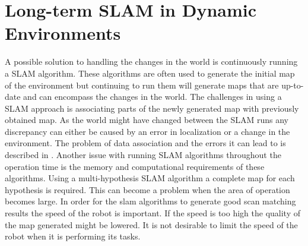 \section{Long-term SLAM in Dynamic Environments}
A possible solution to handling the changes in the world is continuously running a SLAM algorithm. 
These algorithms are often used to generate the initial map of the environment but continuing to run them will generate maps that are up-to-date and can encompass the changes in the world. The challenges in using a SLAM approach is associating parts of the newly generated map with previously obtained map. 
As the world might have changed between the SLAM runs any discrepancy can either be caused by an error in localization or a change in the environment. 
The problem of data association and the errors it can lead to is described in \cite{tipaldi2013lifelong}. 
Another issue with running SLAM algorithms throughout the operation time is the memory and computational requirements of these algorithms. Using a multi-hypothesis SLAM algorithm a complete map for each hypothesis is required. This can become a problem when the area of operation becomes large. 
In order for the slam algorithms to generate good scan matching results the speed of the robot is important. If the speed is too high the quality of the map generated might be lowered. It is not desirable to limit the speed of the robot when it is performing its tasks. 
